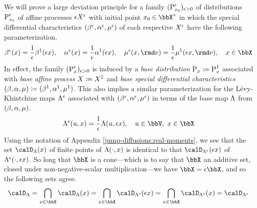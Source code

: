 We will prove a large deviation principle for a family $({\operatorname{P}}^\epsilon_{x_0})_{\epsilon>0}$ of distributions ${\operatorname{P}}^\epsilon_{x_0}$ of affine processes $\epsilon X^\epsilon$ with initial point $\stateVar_0 \in \stateSpace^\circ$ in which the special differential characteristics $(\beta^\epsilon, \alpha^\epsilon, \mu^\epsilon)$ of each respective $X^\epsilon$ have the following parameterization.
\begin{equation}
  \label{eq:special-characteristic-asymptotics}
  \affDrift^\epsilon(\stateVar) = \frac1\epsilon \affDrift^1(\epsilon\stateVar), \quad
  \affDiff^\epsilon(\stateVar) = \frac1\epsilon \affDiff^1(\epsilon\stateVar), \quad
  \affJump^\epsilon(\stateVar, \rmd\markVar) = \frac1\epsilon \affJump^1(\epsilon\stateVar, \rmd\markVar), \quad \stateVar \in \stateSpace
\end{equation}
In effect, the family $({\operatorname{P}}^\epsilon_x)_{\epsilon>0}$ is induced by a \emph{base distribution} ${\operatorname{P}}_x \coloneqq {\operatorname{P}}^1_x$ associated with \emph{base affine process} $X \coloneqq X^1$ and \emph{base special differential characteristics} $(\beta, \alpha, \mu) \coloneqq (\beta^1, \alpha^1, \mu^1)$.
This also implies a similar parameterization for the L\'evy-Khintchine maps $\Lambda^\epsilon$ associated with $(\beta^\epsilon, \alpha^\epsilon, \mu^\epsilon)$ in terms of the base map $\Lambda$ from $(\beta, \alpha, \mu)$.
\begin{equation}
  \label{eq:LK-asymptotics}
  \ode^\epsilon(\momentVar, \stateVar) = \frac1\epsilon \ode(\momentVar, \epsilon \stateVar), \quad \momentVar \in \vecSpace, ~ \stateVar \in \stateSpace
\end{equation}
Using the notation of Appendix \ref{jump-diffusions:real-moments}, we see that the set $\odeSpace(\stateVar)$ of finite points of $\Lambda(\cdot, x)$ is identical to that $\odeSpacee(\epsilon\stateVar)$ of $\Lambda^\epsilon(\cdot, \epsilon x)$.
So long that $\stateSpace$ is a cone---which is to say that $\stateSpace$ an additive set, closed under non-negative-scalar multiplication---we have $\stateSpace = \epsilon\stateSpace$, and so the following sets agree.
\begin{equation*}
  \odeSpace = \bigcap_{\stateVar \in \stateSpace} \odeSpace(\stateVar) = \bigcap_{\stateVar \in \stateSpace} \odeSpacee(\epsilon\stateVar) = \bigcap_{\stateVar \in \stateSpace} \odeSpacee(\stateVar) = \odeSpacee
\end{equation*}

